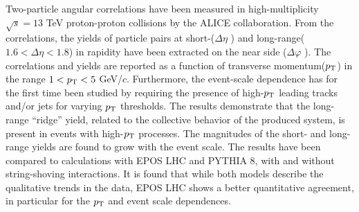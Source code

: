 Two-particle angular correlations have been measured in high-multiplicity $\sqrt{s} =13$ TeV proton-proton collisions by the ALICE collaboration. From the correlations, the yields of particle pairs at short-($\Delta\eta$ ) and long-range($1.6<\Delta\eta<1.8$) in rapidity have been extracted on the near side ($\Delta\varphi$ ).
The correlations and yields are reported as a function of transverse momentum($p_{\rm T}$) in the range $1 < p_{\rm T} < 5$ GeV/$c$.
Furthermore, the event-scale dependence has for the first time been studied by requiring the presence of high-$p_{\rm T}$ leading tracks and/or jets for varying $p_{\rm T}$ thresholds. 
The results demonstrate that the long-range “ridge” yield, related to the collective behavior of the produced system, is present in events with high-$p_{\rm T}$ processes. The magnitudes of the short- and long-range yields are found to grow with the event scale. 
The results have been compared to calculations with EPOS LHC and PYTHIA 8, with and without string-shoving interactions. It is found that while both models describe the qualitative trends in the data, EPOS LHC shows a better quantitative agreement, in particular for the $p_{\rm T}$ and event scale dependences.


